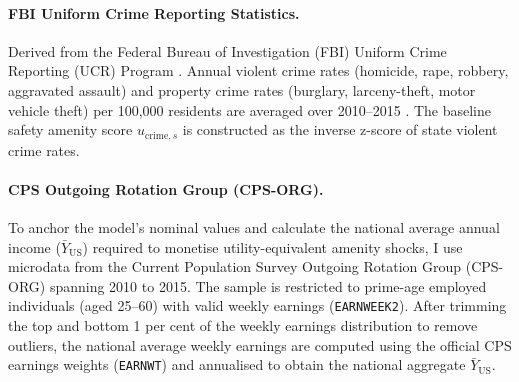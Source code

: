 \paragraph{FBI Uniform Crime Reporting Statistics.} Derived from the Federal Bureau of Investigation (FBI) Uniform Crime Reporting (UCR) Program \citep{fbi2015ucr}. Annual violent crime rates (homicide, rape, robbery, aggravated assault) and property crime rates (burglary, larceny-theft, motor vehicle theft) per 100,000 residents are averaged over 2010--2015 \citep{mccollister_cost_2010}. The baseline safety amenity score $u_{\text{crime}, s}$ is constructed as the inverse z-score of state violent crime rates.




\paragraph{CPS Outgoing Rotation Group (CPS-ORG).} To anchor the model's nominal values and calculate the national average annual income ($\bar{Y}_{\text{US}}$) required to monetise utility-equivalent amenity shocks, I use microdata from the Current Population Survey Outgoing Rotation Group (CPS-ORG) spanning 2010 to 2015. The sample is restricted to prime-age employed individuals (aged 25--60) with valid weekly earnings (\texttt{EARNWEEK2}). After trimming the top and bottom 1 per cent of the weekly earnings distribution to remove outliers, the national average weekly earnings are computed using the official CPS earnings weights (\texttt{EARNWT}) and annualised to obtain the national aggregate $\bar{Y}_{\text{US}}$.

